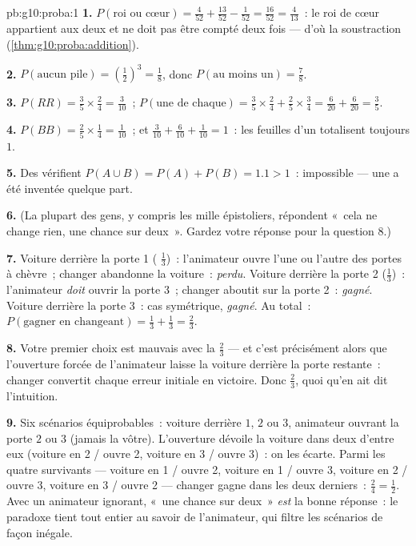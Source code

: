 \begin{solution}{pb:g10:proba:1}
\textbf{1.} $P(\text{roi ou cœur}) = \frac{4}{52} +
\frac{13}{52} - \frac{1}{52} = \frac{16}{52} = \frac{4}{13}$~: le
roi de cœur appartient aux deux  et ne doit pas être compté
deux fois --- d'où la soustraction
(\cref{thm:g10:proba:addition}).

\textbf{2.} $P(\text{aucun pile}) = \left(\frac12\right)^3 =
\frac18$, donc $P(\text{au moins un}) = \frac78$.

\textbf{3.} $P(RR) = \frac35 \times \frac24 = \frac{3}{10}$~;
$P(\text{une de chaque}) = \frac35 \times \frac24 + \frac25
\times \frac34 = \frac{6}{20} + \frac{6}{20} = \frac35$.

\textbf{4.} $P(BB) = \frac25 \times \frac14 = \frac1{10}$~; et
$\frac{3}{10} + \frac{6}{10} + \frac{1}{10} = 1$~: les feuilles d'un
 totalisent toujours $1$.

\textbf{5.} Des   vérifient
$P(A \cup B) = P(A) + P(B) = 1.1 > 1$~: impossible --- une
 a été inventée quelque part.

\textbf{6.} (La plupart des gens, y compris les mille épistoliers,
répondent «~cela ne change rien, une chance sur deux~». Gardez votre
réponse pour la question 8.)

\textbf{7.} Voiture derrière la porte 1 ( $\frac13$)~:
l'animateur ouvre l'une ou l'autre des portes à chèvre~; changer
abandonne la voiture~: \emph{perdu}. Voiture derrière la porte 2
($\frac13$)~: l'animateur \emph{doit} ouvrir la porte 3~; changer
aboutit sur la porte 2~: \emph{gagné}. Voiture derrière la porte 3~:
cas symétrique, \emph{gagné}. Au total~:
$P(\text{gagner en changeant}) = \frac13 + \frac13 = \frac23$.

\textbf{8.} Votre premier choix est mauvais avec la 
$\frac23$ --- et c'est précisément alors que l'ouverture forcée de
l'animateur laisse la voiture derrière la porte restante~: changer
convertit chaque erreur initiale en victoire. Donc $\frac23$, quoi
qu'en ait dit l'intuition.

\textbf{9.} Six scénarios équiprobables~: voiture derrière $1$, $2$
ou $3$, animateur ouvrant la porte $2$ ou $3$ (jamais la vôtre).
L'ouverture dévoile la voiture dans deux d'entre eux (voiture en 2 /
ouvre 2, voiture en 3 / ouvre 3)~: on les écarte. Parmi les quatre
survivants --- voiture en 1 / ouvre 2, voiture en 1 / ouvre 3,
voiture en 2 / ouvre 3, voiture en 3 / ouvre 2 --- changer gagne dans
les deux derniers~: $\frac24 = \frac12$. Avec un animateur ignorant,
«~une chance sur deux~» \emph{est} la bonne réponse~: le paradoxe
tient tout entier au savoir de l'animateur, qui filtre les scénarios
de façon inégale.


\end{solution}
